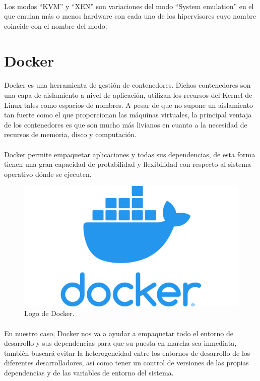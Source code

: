 \paragraph{} Los modos ``\gls{KVM}'' y ``\gls{XEN}'' son variaciones del modo ``System
emulation'' en el que emulan más o menos hardware con cada uno de los hipervisores cuyo
nombre coincide con el nombre del modo.

\section{Docker}\label{sec:docker}

\paragraph{}Docker es una herramienta de gestión de contenedores. Dichos contenedores son
una capa de aislamiento a nivel de aplicación, utilizan los recursos del Kernel de Linux
tales como espacios de nombres. A pesar de que no supone un aislamiento tan fuerte como
el que proporcionan las máquinas virtuales, la principal ventaja de los contenedores es
que son mucho más livianos en cuanto a la necesidad de recursos de memoria, disco y computación.
\cite{docker}

\paragraph{} Docker permite empaquetar aplicaciones y todas sus dependencias, de esta
forma tienen una gran capacidad de protabilidad y flexibilidad con respecto al sistema
operativo dónde se ejecuten.

\begin{figure}[H]
	\centering
	\includegraphics[width=0.50\linewidth]{imgs/docker-logo}
	\caption[Docker Logo]{Logo de Docker.}
	\label{fig:docker}
\end{figure}

\paragraph{} En nuestro caso, Docker nos va a ayudar a empaquetar todo el entorno de
desarrollo y sus dependencias para que su puesta en marcha sea inmediata, también buscará
evitar la heterogeneidad entre los entornos de desarrollo de los diferentes desarrolladores,
así como tener un control de versiones de las propias dependencias y de las variables
de entorno del sistema.

